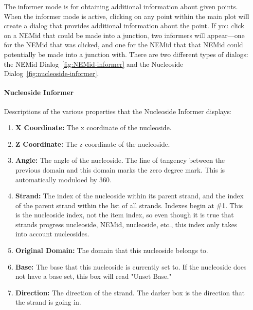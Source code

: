 \documentclass[titlepage]{article}
\begin{document}
	The informer mode is for obtaining additional information about given points. When the informer mode is active, clicking on any point within the main plot will create a dialog that provides additional information about the point. If you click on a NEMid that could be made into a junction, two informers will appear---one for the NEMid that was clicked, and one for the NEMid that that NEMid could potentially be made into a junction with. There are two different types of dialogs: the NEMid Dialog~\ref{fig:NEMid-informer} and the Nucleoside Dialog~\ref{fig:nucleoside-informer}.
	
	\paragraph{Nucleoside Informer} \label{paragraph:nucleoside-informer}
	Descriptions of the various properties that the Nucleoside Informer displays:
	\begin{enumerate}
		\item \textbf{X Coordinate:} The x coordinate of the nucleoside. \label{item:nucleoside-informer-x-coord}
		\item \textbf{Z Coordinate:} The z coordinate of the nucleoside. \label{item:nucleoside-informer-z-coord}
		\item \textbf{Angle:} The angle of the nucleoside. The line of tangency between the previous domain and this domain marks the zero degree mark. This is automatically moduloed by 360. \label{item:nucleoside-informer-angle}
		\item \textbf{Strand:} The index of the nucleoside within its parent strand, and the index of the parent strand within the list of all strands. Indexes begin at \#1. This is the nucleoside index, not the item index, so even though it is true that strands progress nucleoside, NEMid, nucleoside, etc., this index only takes into account nucleosides. \label{item:nucleoside-informer-strand}
		\item \textbf{Original Domain:} The domain that this nucleoside belongs to. \label{item:nucleoside-informer-domain}
		\item \textbf{Base:} The base that this nucleoside is currently set to. If the nucleoside does not have a base set, this box will read "Unset Base."
		\item \textbf{Direction:} The direction of the strand. The darker box is the direction that the strand is going in.  \label{item:nucleoside-informer-direction}
	\end{enumerate}
\end{document}
